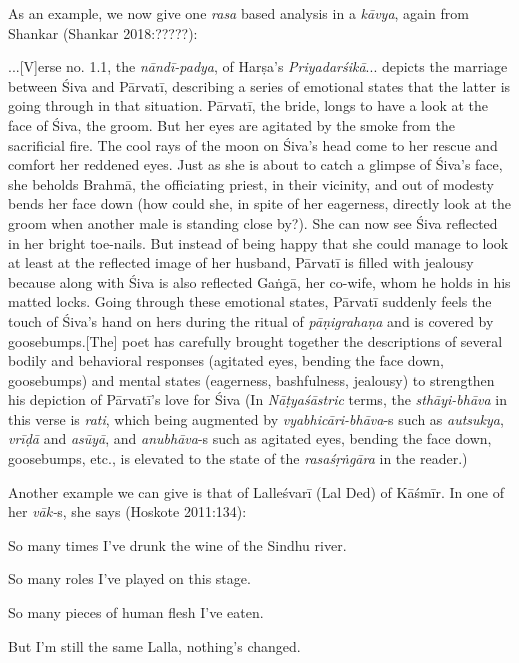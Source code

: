 As an example, we now give one \textsl{rasa} based analysis in a \textsl{kāvya}, again from Shankar (Shankar 2018:?????):

\begin{myquote}
...[V]erse no. 1.1, the \textsl{nāndī-padya}, of Harṣa’s \textsl{Priyadarśikā}... depicts the marriage between Śiva and Pārvatī, describing a series of emotional states that the latter is going through in that situation. Pārvatī, the bride, longs to have a look at the face of Śiva, the groom. But her eyes are agitated by the smoke from the sacrificial fire. The cool rays of the moon on Śiva’s head come to her rescue and comfort her reddened eyes. Just as she is about to catch a glimpse of Śiva’s face, she beholds Brahmā, the officiating priest, in their vicinity, and out of modesty bends her face down (how could she, in spite of her eagerness, directly look at the groom when another male is standing close by?). She can now see Śiva reflected in her bright toe-nails. But instead of being happy that she could manage to look at least at the reflected image of her husband, Pārvatī is filled with jealousy because along with Śiva is also reflected Gaṅgā, her co-wife, whom he holds in his matted locks. Going through these emotional states, Pārvatī suddenly feels the touch of Śiva’s hand on hers during the ritual of \textsl{pāṇigrahaṇa} and is covered by goosebumps.[The] poet has carefully brought together the descriptions of several bodily and behavioral responses (agitated eyes, bending the face down, goosebumps) and mental states (eagerness, bashfulness, jealousy) to strengthen his depiction of Pārvatī’s love for Śiva (In \textsl{Nāṭyaśāstric} terms, the \textsl{sthāyi-bhāva} in this verse is \textsl{rati}, which being augmented by \textsl{vyabhicāri-bhāva}-s such as \textsl{autsukya}, \textsl{vrīḍā} and \textsl{asūyā}, and \textsl{anubhāva}-s such as agitated eyes, bending the face down, goosebumps, etc., is elevated to the state of the \textsl{rasaśṛṅgāra} in the reader.)
\end{myquote}

Another example we can give is that of Lalleśvarī (Lal Ded) of Kāśmīr. In one of her \textsl{vāk-}s, she says (Hoskote 2011:134):

\begin{myquote}
So many times I’ve drunk the wine of the Sindhu river.

So many roles I’ve played on this stage.

So many pieces of human flesh I’ve eaten.

But I’m still the same Lalla, nothing’s changed.
\end{myquote}

